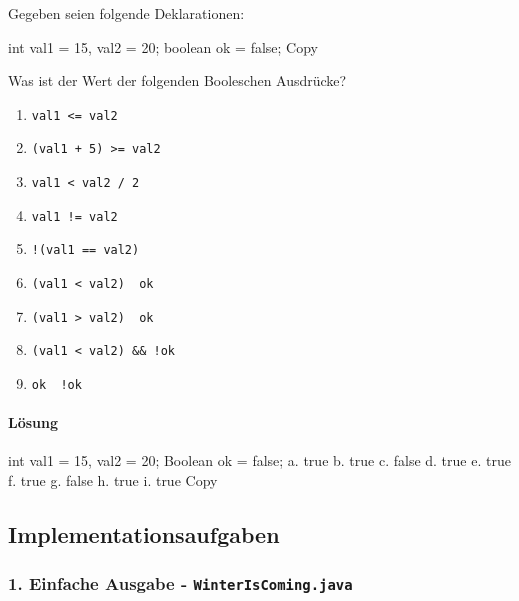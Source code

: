 \documentclass[
]{article}
\newenvironment{Shaded}{}{}
\newcommand{\NormalTok}[1]{#1}
\providecommand{\tightlist}{%
  \setlength{\itemsep}{0pt}\setlength{\parskip}{0pt}}
\begin{document}
Gegeben seien folgende Deklarationen:

\begin{Shaded}
\begin{Highlighting}[]
\NormalTok{int val1 = 15, val2 = 20;  }
\NormalTok{boolean ok = false;  }
\NormalTok{Copy}
\end{Highlighting}
\end{Shaded}

Was ist der Wert der folgenden Booleschen Ausdrücke?

\begin{enumerate}
\tightlist
\item
  \texttt{val1\ \textless{}=\ val2}
\item
  \texttt{(val1\ +\ 5)\ \textgreater{}=\ val2}
\item
  \texttt{val1\ \textless{}\ val2\ /\ 2}
\item
  \texttt{val1\ !=\ val2}
\item
  \texttt{!(val1\ ==\ val2)}
\item
  \texttt{(val1\ \textless{}\ val2)\ \textbar{}\textbar{}\ ok}
\item
  \texttt{(val1\ \textgreater{}\ val2)\ \textbar{}\textbar{}\ ok}
\item
  \texttt{(val1\ \textless{}\ val2)\ \&\&\ !ok}
\item
  \texttt{ok\ \textbar{}\textbar{}\ !ok}
\end{enumerate}

\paragraph{Lösung}\label{luxf6sung-5}

\begin{Shaded}
\begin{Highlighting}[]
\NormalTok{int val1 = 15, val2 = 20;}
\NormalTok{Boolean ok = false;}
\NormalTok{a. true}
\NormalTok{b. true}
\NormalTok{c. false}
\NormalTok{d. true}
\NormalTok{e. true}
\NormalTok{f. true}
\NormalTok{g. false}
\NormalTok{h. true}
\NormalTok{i. true}
\NormalTok{Copy}
\end{Highlighting}
\end{Shaded}

\subsection{Implementationsaufgaben}\label{implementationsaufgaben}

\subsubsection{\texorpdfstring{1. Einfache Ausgabe -
\texttt{WinterIsComing.java}}{1. Einfache Ausgabe - WinterIsComing.java}}\label{einfache-ausgabe---winteriscoming.java}
\end{document}
